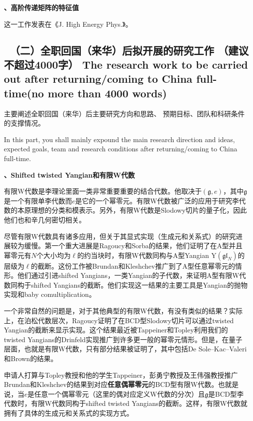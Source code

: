 \documentclass[12pt,UTF8,AutoFakeBold=4,a4paper]{ctexart}
\begin{document}
\medskip

\textbf{、高阶传递矩阵的特征值}

这一工作发表在《J. High Energy Phys.》。

{\color{MsBlue} \subsection{\sihao \kaishu \quad \ 
\textbf{（二）全职回国（来华）后拟开展的研究工作} （建议不超过4000字） 
\bfseries \xiaosihao {} 
The research work to 
be carried out after returning/coming to China full-time(no more than 4000 words)} 
}

{\sihao \color{MsBlue} \kaishu 主要阐述全职回国（来华）后主要研究方向和思路、
预期目标、团队和科研条件的支撑情况。}

{\color{MsBlue}  
In this part, you shall mainly expound the main research direction and ideas, 
expected goals, team and research conditions after returning/coming to China 
full-time.}

\medskip

\textbf{、Shifted twisted Yangian和有限W代数}

有限W代数是李理论里面一类非常重要重要的结合代数。他取决于$(\mathfrak g,e)$，其中$\mathfrak g$是一个有限单李代数而$e$是它的一个幂零元。有限W代数被广泛的应用于研究李代数的本原理想的分类和模表示。另外，有限W代数是Slodowy切片的量子化，因此他们也和辛几何密切相关。

尽管有限W代数具有诸多应用，但关于其显式实现（生成元和关系式）的研究进展较为缓慢。第一个重大进展是Ragoucy和Sorba的结果，他们证明了在A型并且幂零元有$N$个大小均为$\ell$的约当块时，有限W代数同构与A型Yangian $\mathrm{Y}(\mathfrak{gl}_N)$的层级为$\ell$的截断。这份工作被Brundan和Kleshchev推广到了A型任意幂零元的情形。他们通过引进shifted Yangians，一类Yangian的子代数，来证明A型有限W代数同构于shifted Yangians的截断。他们实现这一结果的主要工具是Yangian的抛物实现和baby comultiplication。

一个非常自然的问题是，对于其他典型的有限W代数，有没有类似的结果？实际上，在泊松代数层次，Ragoucy证明了在BCD型Slodowy切片可以通过twisted Yangian的截断来显示实现。这个结果最近被Tappeiner和Topley利用我们的twisted Yangians的Drinfeld实现推广到许多更一般的幂零元情形。但是，在量子层面，也就是有限W代数，只有部分结果被证明了，其中包括De Sole–Kac–Valeri和Brown的结果。

申请人打算与Topley教授和他的学生Tappeiner，彭勇宁教授及王伟强教授推广Brundan和Kleshchev的结果到对应\textbf{任意偶幂零元}的BCD型有限W代数。也就是说，当$e$是任意一个偶幂零元（这里的偶对应定义W代数的分次）且$\mathfrak g$是BCD型李代数时，有限W代数同构于shifted twisted Yangians的截断。这样，有限W代数就拥有了具体的生成元和关系式的实现方式。
\end{document}
